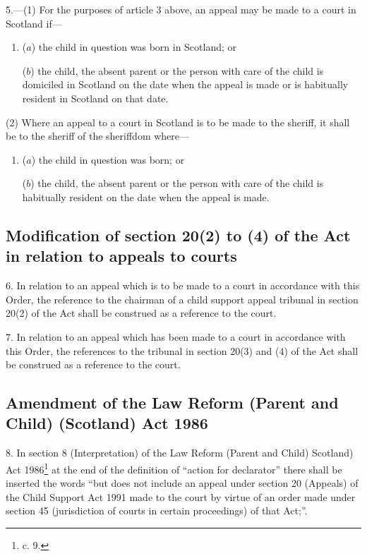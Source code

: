 \documentclass[12pt,a4paper]{article}
\begin{document}
\medskip

5.—(1) For the purposes of article 3 above, an appeal may be made to a court in Scotland if—
\begin{enumerate}\item[]
($a$) the child in question was born in Scotland; or

($b$) the child, the absent parent or the person with care of the child is domiciled in Scotland on the date when the appeal is made or is habitually resident in Scotland on that date.
\end{enumerate}

(2) Where an appeal to a court in Scotland is to be made to the sheriff, it shall be to the sheriff of the sheriffdom where—
\begin{enumerate}\item[]
($a$) the child in question was born; or

($b$) the child, the absent parent or the person with care of the child is habitually resident on the date when the appeal is made.
\end{enumerate}

\subsection[6, 7. Modification of section 20(2) to (4) of the Act in relation to appeals to courts]{Modification of section 20(2) to (4) of the Act in relation to appeals to courts}

6.  In relation to an appeal which is to be made to a court in accordance with this Order, the reference to the chairman of a child support appeal tribunal in section 20(2) of the Act shall be construed as a reference to the court. 

\medskip

7.  In relation to an appeal which has been made to a court in accordance with this Order, the references to the tribunal in section 20(3) and (4) of the Act shall be construed as a reference to the court.

\subsection[8. Amendment of the Law Reform (Parent and Child) (Scotland) Act 1986]{Amendment of the Law Reform (Parent and Child) (Scotland) Act 1986}

8.  In section 8 (Interpretation) of the Law Reform (Parent and Child) Scotland) Act 1986\footnote{ c. 9.} at the end of the definition of “action for declarator” there shall be inserted the words “but does not include an appeal under section 20 (Appeals) of the Child Support Act 1991 made to the court by virtue of an order made under section 45 (jurisdiction of courts in certain proceedings) of that Act;”.
\end{document}
